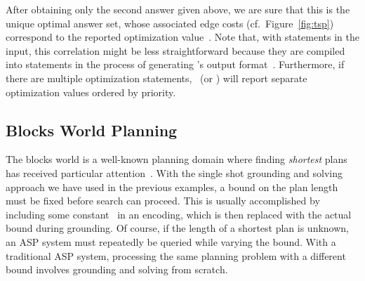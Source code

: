 %
After obtaining only the second answer given above,
we are sure that this is the unique optimal answer set,
whose associated edge costs (cf.\ Figure~\ref{fig:tsp}) correspond to
the reported optimization value~.
Note that, with  statements in the input, this correlation
might be less straightforward because they are compiled into 
statements in the process of generating \lparse's output format~\cite{lparseManual}.
Furthermore, if there are multiple optimization statements,
\clasp\ (or \clingo) will report separate optimization values ordered by priority.

\subsection{Blocks World Planning}\label{subsec:ex:block}

The blocks world is a well-known planning domain
where finding \emph{shortest} plans has received particular attention~\cite{gupnau92a}.
With the single shot grounding and solving approach we have used in the previous examples,
a bound on the plan length must be fixed before search can proceed.
This is usually accomplished by including some constant~
in an encoding, which is then replaced with the actual bound during grounding.
Of course, if the length of a shortest plan is unknown,
an ASP system must repeatedly be queried while varying the bound.
With a traditional ASP system, processing
the same planning problem with a different bound
involves grounding and solving from scratch.

